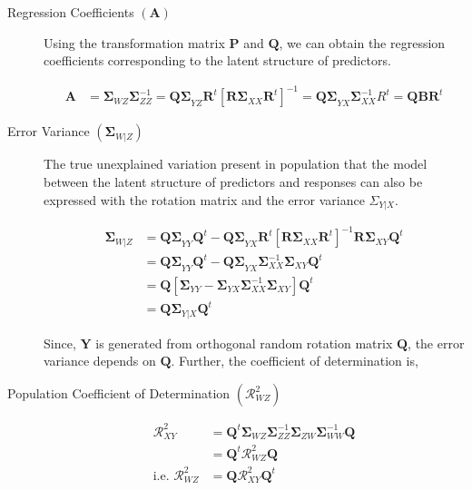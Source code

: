 \documentclass[12pt,a4paperpaper,authoryear]{elsarticle} %
\begin{document}
\begin{description}
\item[Regression Coefficients \(\left(\mathbf{A}\right)\)]
Using the transformation matrix \(\mathbf{P}\) and \(\mathbf{Q}\), we
can obtain the regression coefficients corresponding to the latent
structure of predictors.

\begin{align}
\mathbf{A}  &   = \boldsymbol{\Sigma}_{WZ} \boldsymbol{\Sigma}_{ZZ}^{-1}
              = \boldsymbol{Q\Sigma}_{YZ}\mathbf{R}^t\left[\boldsymbol{R\Sigma}_{XX}\mathbf{R}^t\right]^{-1}
              = \boldsymbol{Q\Sigma}_{YX}\boldsymbol{\Sigma}_{XX}^{-1}R^t = \mathbf{QBR}^t
  \end{align}
\item[Error Variance \(\left(\boldsymbol{\Sigma}_{W|Z}\right)\)]
The true unexplained variation present in population that the model
between the latent structure of predictors and responses can also be
expressed with the rotation matrix and the error variance
\(\Sigma_{Y|X}\).

\begin{align}
\boldsymbol{\Sigma}_{W|Z}
&=  \boldsymbol{Q\Sigma}_{YY}\mathbf{Q}^t -
\boldsymbol{Q \Sigma}_{YX}\mathbf{R}^t \left[\boldsymbol{R\Sigma}_{XX}\boldsymbol{R}^t\right]^{-1}
  \boldsymbol{R\Sigma}_{XY}\mathbf{Q}^t \nonumber \\
&=  \boldsymbol{Q\Sigma}_{YY}\mathbf{Q}^t - \boldsymbol{Q \Sigma}_{YX}\boldsymbol{\Sigma}_{XX}^{-1}\boldsymbol{\Sigma}_{XY}\mathbf{Q}^t \nonumber \\
&=  \mathbf{Q}\left[\boldsymbol{\Sigma}_{YY} -
  \boldsymbol{\Sigma}_{YX}\boldsymbol{\Sigma}_{XX}^{-1}\boldsymbol{\Sigma}_{XY}\right]\mathbf{Q}^{t} \nonumber \\
&=  \mathbf{Q} \boldsymbol{\Sigma}_{Y|X}\mathbf{Q}^t
  \end{align}

Since, \(\mathbf{Y}\) is generated from orthogonal random rotation
matrix \(\mathbf{Q}\), the error variance depends on \(\mathbf{Q}\).
Further, the coefficient of determination is,
\item[Population Coefficient of Determination
\(\left(\boldsymbol{\mathcal{R}}_{WZ}^{2}\right)\)]
\begin{align}
\boldsymbol{\mathcal{R}}^2_{XY} & =
                          \mathbf{Q}^t\boldsymbol{\Sigma}_{WZ}\boldsymbol{\Sigma}^{-1}_{ZZ}\boldsymbol{\Sigma}_{ZW}\boldsymbol{\Sigma}_{WW}^{-1}\boldsymbol{Q} \nonumber \\
                        & = \mathbf{Q}^t\boldsymbol{\mathcal{R}}^2_{WZ}\mathbf{Q} \nonumber \\
\text{i.e. }\boldsymbol{\mathcal{R}}^2_{WZ} &= \mathbf{Q}\boldsymbol{\mathcal{R}}^2_{XY}\mathbf{Q}^t
\end{align}
\end{description}
\end{document}
